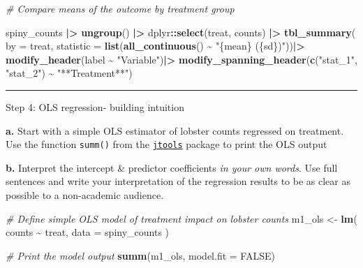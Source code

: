\documentclass[
]{article}
\newenvironment{Shaded}{\begin{snugshade}}{\end{snugshade}}
\newcommand{\AttributeTok}[1]{\textcolor[rgb]{0.13,0.29,0.53}{#1}}
\newcommand{\CommentTok}[1]{\textcolor[rgb]{0.56,0.35,0.01}{\textit{#1}}}
\newcommand{\ConstantTok}[1]{\textcolor[rgb]{0.56,0.35,0.01}{#1}}
\newcommand{\FunctionTok}[1]{\textcolor[rgb]{0.13,0.29,0.53}{\textbf{#1}}}
\newcommand{\NormalTok}[1]{#1}
\newcommand{\OtherTok}[1]{\textcolor[rgb]{0.56,0.35,0.01}{#1}}
\newcommand{\SpecialCharTok}[1]{\textcolor[rgb]{0.81,0.36,0.00}{\textbf{#1}}}
\newcommand{\StringTok}[1]{\textcolor[rgb]{0.31,0.60,0.02}{#1}}
\begin{document}
\begin{Shaded}
\begin{Highlighting}[]
\CommentTok{\# Compare means of the outcome by treatment group}

\NormalTok{spiny\_counts }\SpecialCharTok{|\textgreater{}} 
    \FunctionTok{ungroup}\NormalTok{() }\SpecialCharTok{|\textgreater{}}
\NormalTok{    dplyr}\SpecialCharTok{::}\FunctionTok{select}\NormalTok{(treat, counts) }\SpecialCharTok{|\textgreater{}}
    \FunctionTok{tbl\_summary}\NormalTok{(}
        \AttributeTok{by =}\NormalTok{ treat,}
        \AttributeTok{statistic =} \FunctionTok{list}\NormalTok{(}\FunctionTok{all\_continuous}\NormalTok{() }\SpecialCharTok{\textasciitilde{}} \StringTok{"\{mean\} (\{sd\})"}\NormalTok{))}\SpecialCharTok{|\textgreater{}}
    \FunctionTok{modify\_header}\NormalTok{(label }\SpecialCharTok{\textasciitilde{}} \StringTok{"Variable"}\NormalTok{)}\SpecialCharTok{|\textgreater{}}
    \FunctionTok{modify\_spanning\_header}\NormalTok{(}\FunctionTok{c}\NormalTok{(}\StringTok{"stat\_1"}\NormalTok{, }\StringTok{"stat\_2"}\NormalTok{) }\SpecialCharTok{\textasciitilde{}} \StringTok{"**Treatment**"}\NormalTok{)}
\end{Highlighting}
\end{Shaded}

\begin{center}\rule{0.5\linewidth}{0.5pt}\end{center}

Step 4: OLS regression- building intuition

\textbf{a.} Start with a simple OLS estimator of lobster counts
regressed on treatment. Use the function \texttt{summ()} from the
\href{https://jtools.jacob-long.com/}{\texttt{jtools}} package to print
the OLS output

\textbf{b.} Interpret the intercept \& predictor coefficients \emph{in
your own words}. Use full sentences and write your interpretation of the
regression results to be as clear as possible to a non-academic
audience.

\begin{Shaded}
\begin{Highlighting}[]
\CommentTok{\# Define simple OLS model of treatment impact on lobster counts}
\NormalTok{m1\_ols }\OtherTok{\textless{}{-}} \FunctionTok{lm}\NormalTok{(}
\NormalTok{    counts }\SpecialCharTok{\textasciitilde{}}\NormalTok{ treat,}
    \AttributeTok{data =}\NormalTok{ spiny\_counts}
\NormalTok{)}

\CommentTok{\# Print the model output}
\FunctionTok{summ}\NormalTok{(m1\_ols, }\AttributeTok{model.fit =} \ConstantTok{FALSE}\NormalTok{) }
\end{Highlighting}
\end{Shaded}
\end{document}
